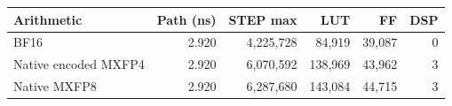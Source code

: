 \begin{tabular}{lrrrrr}
\toprule
Arithmetic & Path (ns) & STEP max & LUT & FF & DSP \\
\midrule
BF16 & 2.920 & 4{,}225{,}728 & 84{,}919 & 39{,}087 & 0 \\
Native encoded MXFP4 & 2.920 & 6{,}070{,}592 & 138{,}969 & 43{,}962 & 3 \\
Native MXFP8 & 2.920 & 6{,}287{,}680 & 143{,}084 & 44{,}715 & 3 \\
\bottomrule
\end{tabular}
